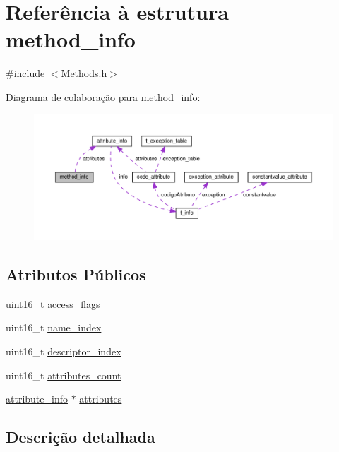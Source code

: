 \hypertarget{structmethod__info}{}\section{Referência à estrutura method\+\_\+info}
\label{structmethod__info}


{\ttfamily \#include $<$Methods.\+h$>$}



Diagrama de colaboração para method\+\_\+info\+:
\nopagebreak
\begin{figure}[H]
\begin{center}
\leavevmode
\includegraphics[width=350pt]{structmethod__info__coll__graph}
\end{center}
\end{figure}
\subsection*{Atributos Públicos}
\begin{DoxyCompactItemize}
\item 
uint16\+\_\+t \hyperlink{structmethod__info_a8fc68aba419f2617deda879c467f5410}{access\+\_\+flags}
\item 
uint16\+\_\+t \hyperlink{structmethod__info_af0ba3d6d566432e74eed5c37cd998c14}{name\+\_\+index}
\item 
uint16\+\_\+t \hyperlink{structmethod__info_abccd6a5202d4c0ee1be6b89692d0352a}{descriptor\+\_\+index}
\item 
uint16\+\_\+t \hyperlink{structmethod__info_a9e711e4dfb8181f7dce16c6f640ba734}{attributes\+\_\+count}
\item 
\hyperlink{structattribute__info}{attribute\+\_\+info} $\ast$ \hyperlink{structmethod__info_a8ce4caaa03680c91f548558a38647ad8}{attributes}
\end{DoxyCompactItemize}


\subsection{Descrição detalhada}


